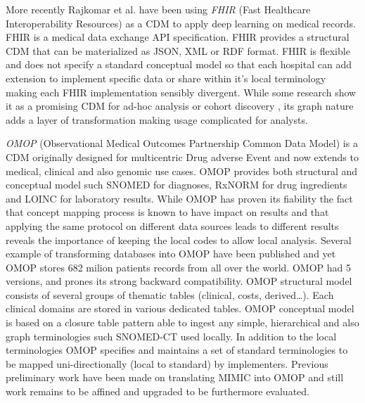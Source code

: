 More recently Rajkomar et al. have been using \emph{FHIR} (Fast Healthcare
Interoperability Resources) as a CDM to apply deep learning on medical records.
FHIR is a medical data exchange API specification. FHIR provides a structural
CDM that can be materialized as JSON, XML or RDF format. FHIR is flexible and
does not specify a standard conceptual model so that each hospital can add
extension to implement specific data or share within it's local terminology
making each FHIR implementation sensibly divergent. While some research show it
as a promising CDM for ad-hoc analysis \cite{fhir-google} or cohort discovery
\cite{fhir-paris}, its graph nature adds a layer of transformation making usage
complicated for analysts. 

\textit{OMOP} (Observational Medical Outcomes Partnership Common Data
Model) is a CDM originally designed for multicentric Drug adverse Event and now
extends to medical, clinical and also genomic use cases. OMOP provides both
structural and conceptual model such SNOMED for diagnoses, RxNORM for drug
ingredients and LOINC for laboratory results. While OMOP has proven its
fiability \cite{omop-eval} the fact that concept mapping process is known to
have impact on results \cite{omop-concept-impact} and that applying the same
protocol on different data sources leads to different results
\cite{omop-replicability} reveals the importance of keeping the local codes to
allow local analysis. Several example of transforming databases into OMOP have
been published \cite{omop-german,omop-nashville} and yet OMOP stores 682 milion
patients records from all over the world\cite{omop-bigboy}. OMOP had 5
versions, and prones its strong backward compatibility.
OMOP structural model consists of several groups of thematic tables (clinical,
costs, derived\ldots). Each clinical domains are stored in various dedicated
tables.
OMOP conceptual model is based on a closure table pattern \cite{closure-table}
able to ingest any simple, hierarchical and also graph terminologies such
SNOMED-CT used locally. In addition to the local terminologies OMOP specifies
and maintains a set of standard terminologies to be mapped uni-directionally
(local to standard) by implementers.
Previous preliminary work have been made on translating MIMIC into OMOP
\cite{mimic-omop-previous} and still work remains to be affined and upgraded to
be furthermore evaluated.
\\

